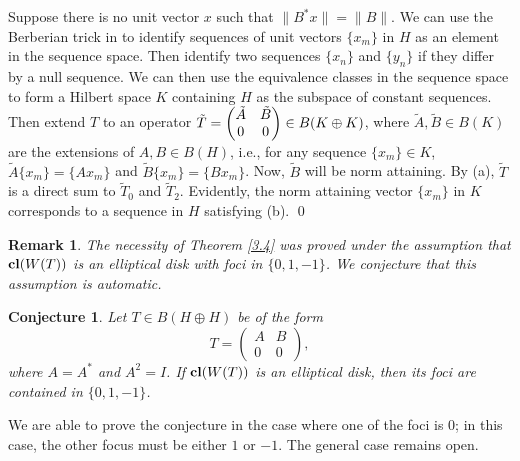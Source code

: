 \documentclass[11pt]{article}
\newtheorem{remark}[theorem]{Remark}
\newtheorem{conjecture}[theorem]{Conjecture}
\numberwithin{equation}{section}
\def\cl{{\bf cl}}
\begin{document}
Suppose there is no unit vector $x$ such that $\|B^*x\| = \|B\|$.
We can use the Berberian trick in \cite{B} to identify sequences of unit vectors
$\{x_m\}$ in $H$ as an element in
the sequence space. Then identify two sequences $\{x_n\}$ and $\{y_n\}$ if
they differ by a null sequence. We can then use the equivalence classes
in the sequence space to form a Hilbert space
$K$ containing $H$ as the subspace of constant sequences.
Then extend $T$ to an operator
$\tilde T = \begin{pmatrix} \tilde A & \tilde B \cr 0 & 0 \cr\end{pmatrix} \in B(K\oplus K)$,
where $\tilde A, \tilde B\in B(K)$ are the extensions of $A, B\in B(H)$,
i.e., for any sequence $\{x_m\} \in K$, $\tilde A \{x_m\} = \{A x_m\}$ and
$\tilde B \{x_m\} = \{Bx_m\}$. Now, $\tilde B$ will be norm attaining.
By (a),
$\tilde T$ is a direct sum to $\tilde T_0$ and $\tilde T_2$.
Evidently, the norm attaining vector $\{x_m\}$ in $K$ corresponds to
a sequence in $H$ satisfying (b).
\qed

\medskip
\begin{remark}
The necessity of Theorem \ref{3.4} was proved under the assumption that $\cl (W(T))$ is an elliptical disk with foci in $\{0,1,-1\}$.
We conjecture that this assumption is automatic.
\end{remark}

\begin{conjecture}
Let $T\in B(H\oplus H)$ be of the form
\[
T=\begin{pmatrix}A&B\\0&0\end{pmatrix},
\]
where $A=A^*$ and $A^2=I$. If $\cl (W(T))$ is an elliptical disk,
then its foci are contained in $\{0,1,-1\}$.
\end{conjecture}

We are able to prove the conjecture in the case where one of the foci is
$0$; in this case, the other focus must be either $1$ or $-1$.
The general case remains open.
\end{document}
